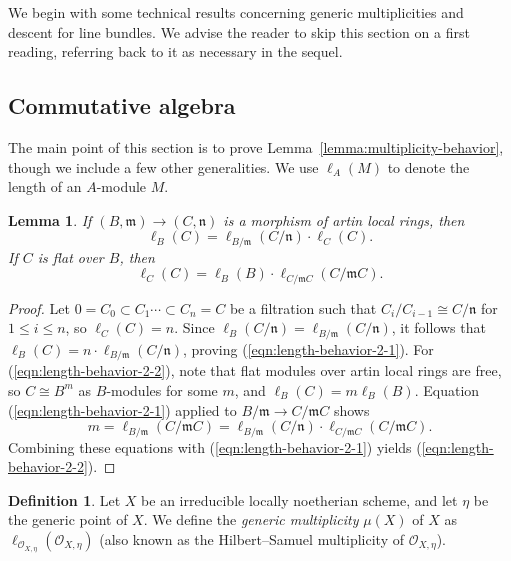 \documentclass[11pt,reqno]{amsart}
\newtheorem{lemma}[theorem]{Lemma}
\theoremstyle{definition}
\newtheorem{definition}[theorem]{Definition}
\newcommand{\sO}{{\mathscr O}}
\newcommand{\fm}{\mathfrak{m}}
\newcommand{\fn}{\mathfrak{n}}
\begin{document}
We begin with some technical results concerning generic multiplicities and descent for line bundles. We advise the reader to skip this section on a first reading, referring back to it as necessary in the sequel.

\subsection{Commutative algebra}

The main point of this section is to prove Lemma~\ref{lemma:multiplicity-behavior}, though we include a few other generalities. We use $\ell_A(M)$ to denote the length of an $A$-module $M$.

\begin{lemma}\label{lemma:length-behavior-2}
    If $(B, \fm) \to (C, \fn)$ is a morphism of artin local rings, then
    \begin{equation}\label{eqn:length-behavior-2-1}
    \ell_B(C) = \ell_{B/\fm}(C/\fn) \cdot \ell_C(C).
    \end{equation}
    If $C$ is flat over $B$, then
    \begin{equation}\label{eqn:length-behavior-2-2}
    \ell_C(C) = \ell_B(B) \cdot \ell_{C/\fm C}(C/\fm C).
    \end{equation}
\end{lemma}

\begin{proof}
    Let $0 = C_0 \subset C_1 \cdots \subset C_n = C$ be a filtration such that $C_i/C_{i-1} \cong C/\fn$ for $1 \leq i \leq n$, so $\ell_C(C) = n$. Since $\ell_B(C/\fn) = \ell_{B/\fm}(C/\fn)$, it follows that $\ell_B(C) = n \cdot \ell_{B/\fm}(C/\fn)$, proving (\ref{eqn:length-behavior-2-1}). For (\ref{eqn:length-behavior-2-2}), note that flat modules over artin local rings are free, so $C \cong B^m$ as $B$-modules for some $m$, and $\ell_B(C) = m\ell_B(B)$. Equation (\ref{eqn:length-behavior-2-1}) applied to $B/\fm \to C/\fm C$ shows
    \[
    m = \ell_{B/\fm}(C/\fm C) = \ell_{B/\fm}(C/\fn) \cdot \ell_{C/\fm C}(C/\fm C).
    \]
    Combining these equations with (\ref{eqn:length-behavior-2-1}) yields (\ref{eqn:length-behavior-2-2}).
\end{proof}

\begin{definition}\label{def:mult}
    Let $X$ be an irreducible locally noetherian scheme, and let $\eta$ be the generic point of $X$. We define the \textit{generic multiplicity} $\mu(X)$ of $X$ as $\ell_{\sO_{X, \eta}}(\sO_{X, \eta})$ (also known as the Hilbert--Samuel multiplicity of $\sO_{X,\eta}$).
\end{definition}
\end{document}
